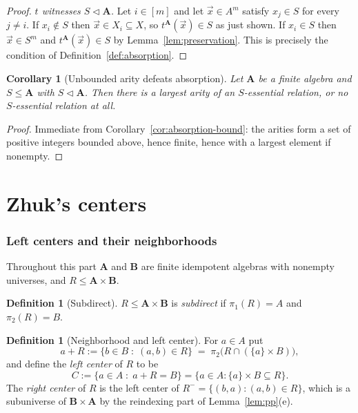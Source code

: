 \documentclass[11pt]{article}
\theoremstyle{mainplain}
\newtheorem{corollary}[theorem]{Corollary}
\theoremstyle{mainroman}
\theoremstyle{definition}
\newtheorem{definition}[theorem]{Definition}
\numberwithin{equation}{section}
\newcommand{\bA}{\mathbf A}
\newcommand{\bB}{\mathbf B}
\newcommand{\ab}{\lhd}
\begin{document}
\begin{proof}
\emph{$t$ witnesses $S\ab\bA$.} Let $i\in[m]$ and let $\vec x\in A^m$ satisfy
$x_j\in S$ for every $j\ne i$. If $x_i\notin S$ then $\vec x\in X_i\subseteq X$,
so $t^{\bA}(\vec x)\in S$ as just shown. If $x_i\in S$ then $\vec x\in S^m$ and
$t^{\bA}(\vec x)\in S$ by Lemma~\ref{lem:preservation}. This is precisely the
condition of Definition~\ref{def:absorption}.
\end{proof}

\begin{corollary}[Unbounded arity defeats absorption]\label{cor:unbounded-no-absorption}
Let $\bA$ be a finite algebra and $S\le\bA$ with $S\ab\bA$. Then there is a
largest arity of an $S$-essential relation, or no $S$-essential relation at all.
\end{corollary}
\begin{proof}
Immediate from Corollary~\ref{cor:absorption-bound}: the arities form a set of
positive integers bounded above, hence finite, hence with a largest element if
nonempty.
\end{proof}

\part{Zhuk's centers}
\label{part:centers}

\section{Left centers and their neighborhoods}\label{sec:centers}

Throughout this part $\bA$ and $\bB$ are finite idempotent algebras with
nonempty universes, and $R\le\bA\times\bB$.

\begin{definition}[Subdirect]\label{def:subdirect}
$R\le\bA\times\bB$ is \emph{subdirect} if $\pi_1(R)=A$ and $\pi_2(R)=B$.
\end{definition}

\begin{definition}[Neighborhood and left center]\label{def:neighborhood}
For $a\in A$ put
\[
 a+R:=\{b\in B\;:\;(a,b)\in R\}\;=\;\pi_2\bigl(R\cap(\{a\}\times B)\bigr),
\]
and define the \emph{left center} of $R$ to be
\[
 C:=\{a\in A\;:\;a+R=B\}=\{a\in A: \{a\}\times B\subseteq R\}.
\]
The \emph{right center} of $R$ is the left center of
$R^{-}=\{(b,a):(a,b)\in R\}$, which is a subuniverse of $\bB\times\bA$ by the
reindexing part of Lemma~\ref{lem:pp}(e).
\end{definition}
\end{document}
